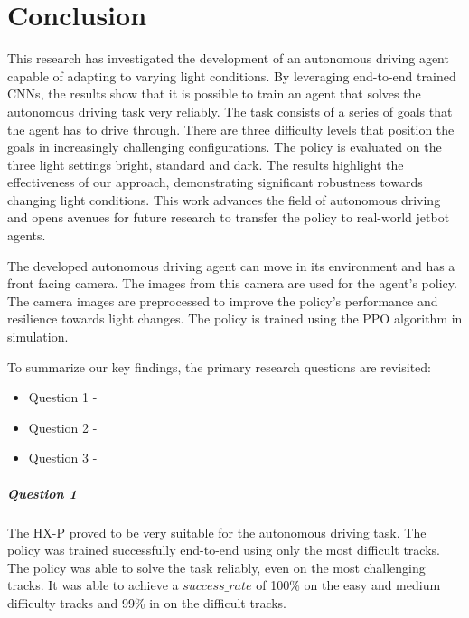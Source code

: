 \chapter{Conclusion}
\label{cha:Conclusion}
\acresetall


This research has investigated the development of an autonomous driving agent capable of adapting to varying light conditions. By leveraging end-to-end trained \acl{CNN}s, the results show that it is possible to train an agent that solves the autonomous driving task very reliably. The task consists of a series of goals that the agent has to drive through. There are three difficulty levels that position the goals in increasingly challenging configurations. The policy is evaluated on the three light settings bright, standard and dark.
The results highlight the effectiveness of our approach, demonstrating significant robustness towards changing light conditions. This work advances the field of autonomous driving and opens avenues for future research to transfer the policy to real-world jetbot agents.

The developed autonomous driving agent can move in its environment and has a front facing camera. The images from this camera are used for the agent's policy. The camera images are preprocessed to improve the policy's performance and resilience towards light changes. The policy is trained using the \ac{PPO} algorithm in simulation.

To summarize our key findings, the primary research questions are revisited:
\begin{itemize}
    \item Question 1 - \questionOne
    \item Question 2 - \questionTwo
    \item Question 3 - \questionThree
\end{itemize}

\paragraph{Question 1}
The \ac{HX-P} proved to be very suitable for the autonomous driving task. The policy was trained successfully end-to-end using only the most difficult tracks. The policy was able to solve the task reliably, even on the most challenging tracks. It was able to achieve a $success\_rate$ of 100\% on the easy and medium difficulty tracks and 99\% in on the difficult tracks.

